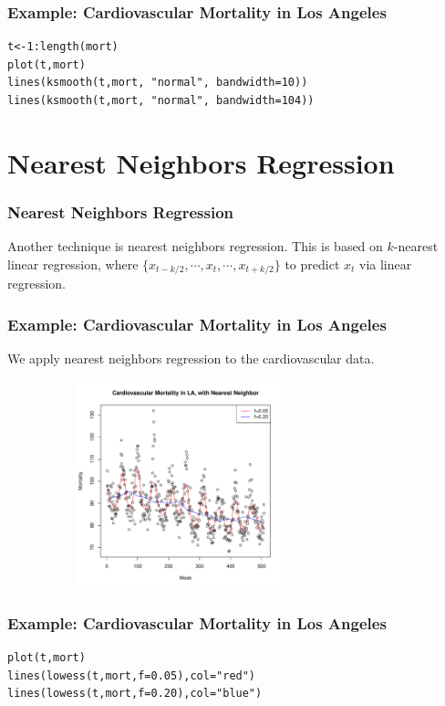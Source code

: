 \documentclass[%
xcolor=pdftex]{beamer}
\begin{document}
\begin{frame}[fragile]
\frametitle{Example: Cardiovascular Mortality in Los Angeles}

\begin{verbatim}
t<-1:length(mort)
plot(t,mort)
lines(ksmooth(t,mort, "normal", bandwidth=10))
lines(ksmooth(t,mort, "normal", bandwidth=104))
\end{verbatim}

\end{frame}

\section{Nearest Neighbors Regression}
\frame{\tableofcontents[currentsection]}

\begin{frame}
\frametitle{Nearest Neighbors Regression}

Another technique is nearest neighbors regression. This is based on $k$-nearest linear regression, where $\{x_{t-k/2}, \cdots, x_t, \cdots, x_{t+k/2} \}$ to predict $x_t$ via linear regression.

\end{frame}

\begin{frame}
\frametitle{Example: Cardiovascular Mortality in Los Angeles}

We apply nearest neighbors regression to the cardiovascular data.

\includegraphics[width=100mm, height=60mm]{neighbor.pdf}

\end{frame}

\begin{frame}[fragile]
\frametitle{Example: Cardiovascular Mortality in Los Angeles}

\begin{verbatim}
plot(t,mort)
lines(lowess(t,mort,f=0.05),col="red")
lines(lowess(t,mort,f=0.20),col="blue")
\end{verbatim}

\end{frame}
\end{document}
